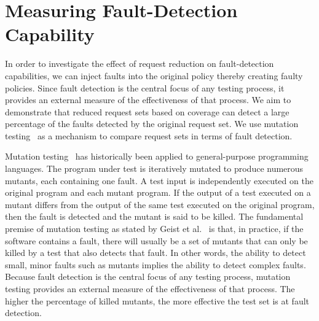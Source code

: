 \section{Measuring Fault-Detection Capability}
\label{sec:mutation}

In order to investigate the effect of request reduction on
fault-detection capabilities, we can inject faults into the original
policy thereby creating faulty policies. Since fault detection is
the central focus of any testing process, it provides an external
measure of the effectiveness of that process. We aim to demonstrate
that reduced request sets based on coverage can detect a large
percentage of the faults detected by the original request set. We
use mutation testing~\cite{demillo78:hints} as a mechanism to
compare request sets in terms of fault detection.



Mutation testing~\cite{demillo78:hints} has historically been
applied to general-purpose programming languages. The program under
test is iteratively mutated to produce numerous mutants, each
containing one fault. A test input is independently executed on the
original program and each mutant program. If the output of a test
executed on a mutant differs from the output of the same test
executed on the original program, then the fault is detected and the
mutant is said to be killed. The fundamental premise of mutation
testing as stated by Geist et al.~\cite{geist92:estimation} is that,
in practice, if the software contains a fault, there will usually be
a set of mutants that can only be killed by a test that also detects
that fault. In other words, the ability to detect small, minor
faults such as mutants implies the ability to detect complex faults.
Because fault detection is the central focus of any testing process,
mutation testing provides an external measure of the effectiveness
of that process. The higher the percentage of killed mutants, the
more effective the test set is at fault detection.

